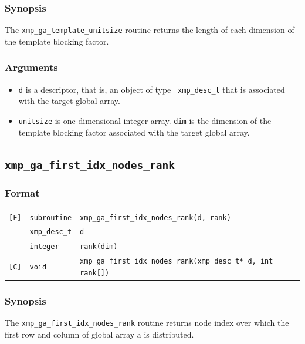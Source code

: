 \subsubsection*{Synopsis}

The {\tt xmp\_ga\_template\_unitsize} routine returns the length of each dimension of 
the template blocking factor.

\subsubsection*{Arguments}

\begin{itemize}
 \item {\tt d} is a descriptor, that is, an object of type {\tt
       xmp\_desc\_t} that is associated with the target global array.
 \item {\tt unitsize} is one-dimensional integer array. {\tt dim} is the dimension 
 of the template blocking factor associated with the target global array.
\end{itemize}


\subsection{\tt xmp\_ga\_first\_idx\_nodes\_rank}

\subsubsection*{Format}

\begin{tabular}{lll}

\verb![F]!&  {\tt subroutine}& {\tt xmp\_ga\_first\_idx\_nodes\_rank(d, rank)}\\
          & {\tt xmp\_desc\_t} & {\tt d}\\
          & {\tt integer} & {\tt rank(dim)}\\

\verb![C]!&  {\tt void}& {\tt xmp\_ga\_first\_idx\_nodes\_rank(xmp\_desc\_t* d, int rank[])}\\

\end{tabular}

\subsubsection*{Synopsis}

The {\tt xmp\_ga\_first\_idx\_nodes\_rank} routine returns node index over which 
the first row and column of global array a is distributed.

